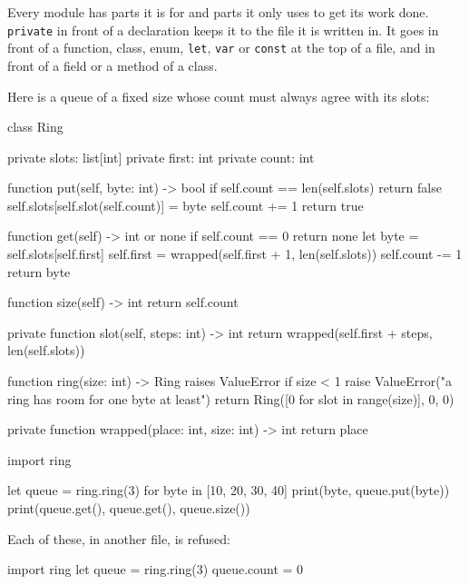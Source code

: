 Every module has parts it is for and parts it only uses to get its
work done. \verb|private| in front of a declaration keeps it to the
file it is written in. It goes in front of a function, class, enum,
\verb|let|, \verb|var| or \verb|const| at the top of a file, and in
front of a field or a method of a class.

Here is a queue of a fixed size whose count must always agree with its
slots:

\begin{zeno}[file=ring.zeno, dir=ring, run=no]
class Ring {
    private slots: list[int]
    private first: int
    private count: int

    function put(self, byte: int) -> bool {
        if self.count == len(self.slots) {
            return false
        }
        self.slots[self.slot(self.count)] = byte
        self.count += 1
        return true
    }

    function get(self) -> int or none {
        if self.count == 0 {
            return none
        }
        let byte = self.slots[self.first]
        self.first = wrapped(self.first + 1, len(self.slots))
        self.count -= 1
        return byte
    }

    function size(self) -> int {
        return self.count
    }

    private function slot(self, steps: int) -> int {
        return wrapped(self.first + steps, len(self.slots))
    }
}

function ring(size: int) -> Ring raises ValueError {
    if size < 1 {
        raise ValueError("a ring has room for one byte at least")
    }
    return Ring([0 for slot in range(size)], 0, 0)
}

private function wrapped(place: int, size: int) -> int {
    return place %
}
\end{zeno}

\begin{zeno}[file=main.zeno, dir=ring]
import ring

let queue = ring.ring(3)
for byte in [10, 20, 30, 40] {
    print(byte, queue.put(byte))
}
print(queue.get(), queue.get(), queue.size())
\end{zeno}

Each of these, in another file, is refused:

\begin{zeno}[file=bad1.zeno, dir=ring, fails=yes]
import ring
let queue = ring.ring(3)
queue.count = 0
\end{zeno}

